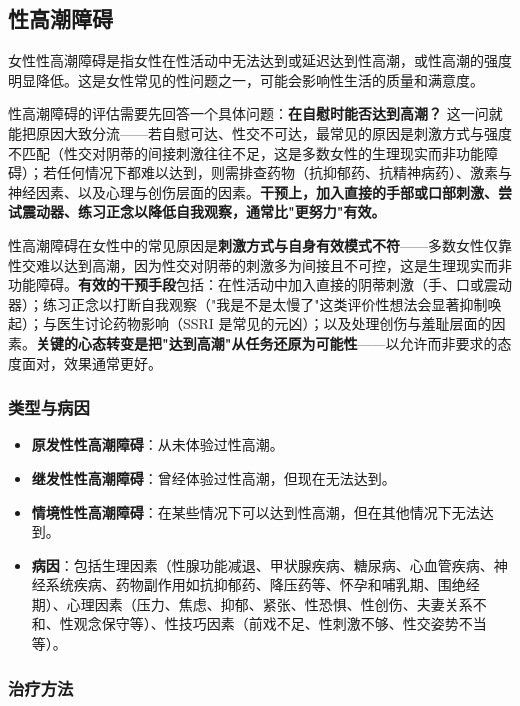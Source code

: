 \subsection{性高潮障碍}

女性性高潮障碍是指女性在性活动中无法达到或延迟达到性高潮，或性高潮的强度明显降低。这是女性常见的性问题之一，可能会影响性生活的质量和满意度。

性高潮障碍的评估需要先回答一个具体问题：\textbf{在自慰时能否达到高潮？} 这一问就能把原因大致分流——若自慰可达、性交不可达，最常见的原因是刺激方式与强度不匹配（性交对阴蒂的间接刺激往往不足，这是多数女性的生理现实而非功能障碍）；若任何情况下都难以达到，则需排查药物（抗抑郁药、抗精神病药）、激素与神经因素、以及心理与创伤层面的因素。\textbf{干预上，加入直接的手部或口部刺激、尝试震动器、练习正念以降低自我观察，通常比"更努力"有效。}

性高潮障碍在女性中的常见原因是\textbf{刺激方式与自身有效模式不符}——多数女性仅靠性交难以达到高潮，因为性交对阴蒂的刺激多为间接且不可控，这是生理现实而非功能障碍。\textbf{有效的干预手段}包括：在性活动中加入直接的阴蒂刺激（手、口或震动器）；练习正念以打断自我观察（"我是不是太慢了"这类评价性想法会显著抑制唤起）；与医生讨论药物影响（SSRI 是常见的元凶）；以及处理创伤与羞耻层面的因素。\textbf{关键的心态转变是把"达到高潮"从任务还原为可能性}——以允许而非要求的态度面对，效果通常更好。

\subsubsection{类型与病因}

\begin{itemize}
\item \textbf{原发性性高潮障碍}：从未体验过性高潮。
\item \textbf{继发性性高潮障碍}：曾经体验过性高潮，但现在无法达到。
\item \textbf{情境性性高潮障碍}：在某些情况下可以达到性高潮，但在其他情况下无法达到。
\item \textbf{病因}：包括生理因素（性腺功能减退、甲状腺疾病、糖尿病、心血管疾病、神经系统疾病、药物副作用如抗抑郁药、降压药等、怀孕和哺乳期、围绝经期）、心理因素（压力、焦虑、抑郁、紧张、性恐惧、性创伤、夫妻关系不和、性观念保守等）、性技巧因素（前戏不足、性刺激不够、性交姿势不当等）。
\end{itemize}

\subsubsection{治疗方法}

